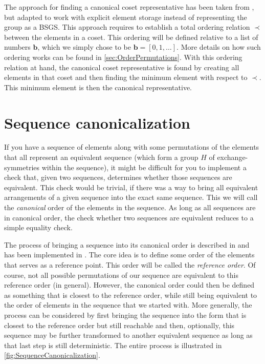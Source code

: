\documentclass[parskip=half]{scrartcl}
\begin{document}
	The approach for finding a canonical coset representative has been taken from \textcite{Manssur2002a}, but adapted to work with explicit element
	storage instead of representing the group as a BSGS. This approach requires to establish a total ordering relation $\prec$ between the elements in
	a coset.\supercite{Manssur2002a} This ordering will be defined relative to a list of numbers $\mathbf{b}$, which we simply chose to be
	$\mathbf{b} = [ 0, 1, \ldots ]$. More details on how such ordering works can be found in \cref{sec:OrderPermutations}. With this ordering
	relation at hand, the canonical coset representative is found by creating all elements in that coset and then finding the minimum element with
	respect to $\prec$. This minimum element is then the canonical representative.


	\section{Sequence canonicalization}

	If you have a sequence of elements along with some permutations of the elements that all represent an equivalent sequence (which form a group $H$
	of exchange-symmetries within the sequence), it might be difficult for you to implement a check that, given two sequences, determines whether
	those sequences are equivalent. This check would be trivial, if there was a way to bring all equivalent arrangements of a given sequence into the
	exact same sequence. This we will call the \emph{canonical} order of the elements in the sequence. As long as all sequences are in canonical
	order, the check whether two sequences are equivalent reduces to a simple equality check.

	The process of bringing a sequence into its canonical order is described in \textcite{Manssur2002a} and has been implemented in \libPerm{}. The
	core idea is to define some order of the elements that serves as a reference point. This order will be called the \emph{reference order}. Of
	course, not all possible permutations of our sequence are equivalent to this reference order (in general). However, the canonical order could then
	be defined as something that is closest to the reference order, while still being equivalent to the order of elements in the sequence that we
	started with. More generally, the process can be considered by first bringing the sequence into the form that is closest to the reference order
	but still reachable and then, optionally, this sequence may be further transformed to another equivalent sequence as long as that last step is
	still deterministic. The entire process is illustrated in \cref{fig:SequenceCanonicalization}.
\end{document}
